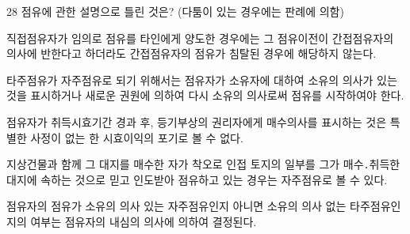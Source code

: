 \begin{question}{28}
점유에 관한 설명으로 틀린 것은? (다툼이 있는 경우에는 판례에 의함)
\begin{choices}
  \item 직접점유자가 임의로 점유를 타인에게 양도한 경우에는 그 점유이전이 간접점유자의 의사에 반한다고 하더라도 간접점유자의 점유가 침탈된 경우에 해당하지 않는다.
  \item 타주점유가 자주점유로 되기 위해서는 점유자가 소유자에 대하여 소유의 의사가 있는 것을 표시하거나 새로운 권원에 의하여 다시 소유의 의사로써 점유를 시작하여야 한다.
  \item 점유자가 취득시효기간 경과 후, 등기부상의 권리자에게 매수의사를 표시하는 것은 특별한 사정이 없는 한 시효이익의 포기로 볼 수 없다.
  \item 지상건물과 함께 그 대지를 매수한 자가 착오로 인접 토지의 일부를 그가 매수․취득한 대지에 속하는 것으로 믿고 인도받아 점유하고 있는 경우는 자주점유로 볼 수 있다.
  \item 점유자의 점유가 소유의 의사 있는 자주점유인지 아니면 소유의 의사 없는 타주점유인지의 여부는 점유자의 내심의 의사에 의하여 결정된다.
\end{choices}
\end{question}
